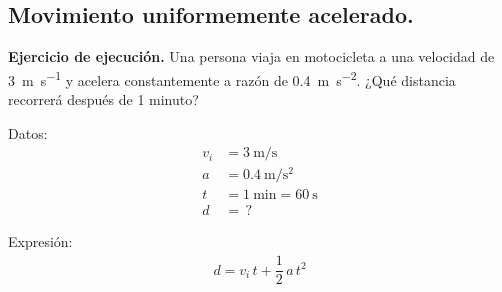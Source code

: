 \documentclass[12pt, letter]{exam}
\begin{document}
\begin{questions}



    \section{Movimiento uniformemente acelerado.}

    \setcounter{question}{7} \question \label{Ejercicio_04} \textbf{Ejercicio de ejecución. } Una persona viaja en motocicleta a una velocidad de \SI{3}{\meter\per\second} y acelera constantemente a razón de \SI{0.4}{\meter\per\square\second}. ¿Qué distancia recorrerá después de 1 minuto?
    
    \begin{minipage}[t]{0.35\linewidth}
    Datos: 
    \begin{align*}
    v_{i} &= \SI{3}{\meter\per\second} \\
    a &= \SI{0.4}{\meter\per\square\second} \\
    t &= \SI{1}{\minute} = \SI{60}{\second} \\
    d &= \, ?
    \end{align*}
    \end{minipage}
    \hspace{1cm}
    \begin{minipage}[t]{0.4\linewidth}
    Expresión:
    \begin{align*}
    d = v_{i} \, t + \dfrac{1}{2} \, a \, t^{2}
    \end{align*}
    \end{minipage}


\end{questions}
\end{document}
